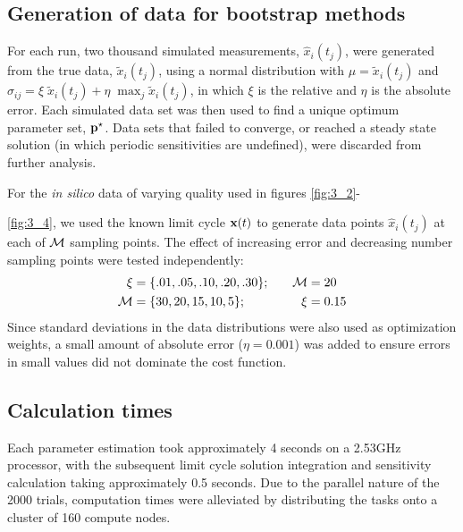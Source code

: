 \subsection{Generation of data for bootstrap methods}
For each run, two thousand simulated measurements, $\hat{x}_i(t_j)$, were generated from the true data, $\tilde{x}_i(t_j)$, using a normal distribution with $\mu = \tilde{x}_i(t_j)$ and $\sigma_{ij} = \xi\;\tilde{x}_i(t_j) + \eta\;\max_j{\tilde{x}_i(t_j)}$, in which $\xi$ is the relative and $\eta$ is the absolute error. 
Each simulated data set was then used to find a unique optimum parameter set, ${\mathbf{p}}^\star$. 
Data sets that failed to converge, or reached a steady state solution (in which periodic sensitivities are undefined), were discarded from further analysis.

For the {\itshape in silico} data of varying quality used in figures \ref{fig:3_2}-{\ref{fig:3_4}, we used the known limit cycle ${\bf x}(t)$ to generate data points $\hat{x}_i(t_j)$ at each of $\cal M$ sampling points. 
The effect of increasing error and decreasing number sampling points were tested independently:
\begin{alignat*}{2}
     \xi &=  \{ .01, .05, .10, .20, .30\}; \quad & {\cal M} &= 20 \\
     {\cal M} &=  \{ 30, 20, 15, 10, 5\}; \; & \xi &= 0.15 
\end{alignat*}
Since standard deviations in the data distributions were also used as optimization weights, a small amount of absolute error ($\eta = 0.001$) was added to ensure errors in small values did not dominate the cost function.

\subsection{Calculation times}
Each parameter estimation took approximately 4 seconds on a 2.53GHz processor, with the subsequent limit cycle solution integration and sensitivity calculation taking approximately 0.5 seconds. 
Due to the parallel nature of the 2000 trials, computation times were alleviated by distributing the tasks onto a cluster of 160 compute nodes.

}
